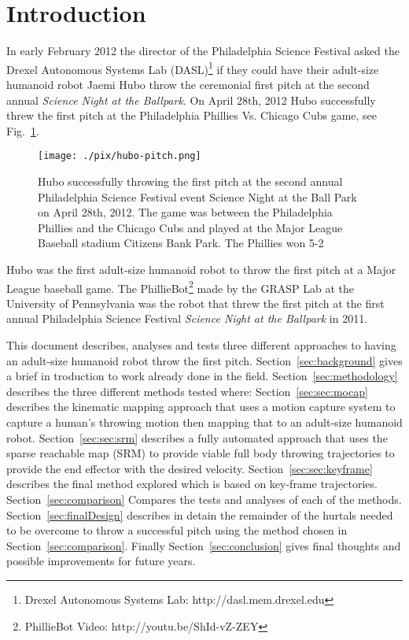 \section{Introduction}
In early February 2012 the director of the Philadelphia Science Festival asked the Drexel Autonomous Systems Lab (DASL)\footnote{Drexel Autonomous Systems Lab: http://dasl.mem.drexel.edu}\label{foot:dasl} if they could have their adult-size humanoid robot Jaemi Hubo throw the ceremonial first pitch at the second annual \textit{Science Night at the Ballpark}.  On April 28th, 2012 Hubo successfully threw the first pitch at the Philadelphia Phillies Vs. Chicago Cubs game, see Fig.~\ref{fig:hubo-throw}.  

\begin{figure}[t]
  \centering
\texttt{[image: ./pix/hubo-pitch.png]}
  \caption{Hubo successfully throwing the first pitch at the second annual Philadelphia Science Festival event Science Night at the Ball Park on April 28th, 2012.  The game was between the Philadelphia Phillies and the Chicago Cubs and played at the Major League Baseball stadium Citizens Bank Park.  The Phillies won 5-2}
  \label{fig:hubo-throw}
\end{figure}

Hubo was the first adult-size humanoid robot to throw the first pitch at a Major League baseball game.  The PhillieBot\footnote{PhillieBot Video: http://youtu.be/ShId-vZ-ZEY} made by the GRASP Lab at the University of Pennsylvania was the robot that threw the first pitch at the first annual Philadelphia Science Festival \textit{Science Night at the Ballpark} in 2011.  

This document describes, analyses and tests three different approaches to having an adult-size humanoid robot throw the first pitch.  
Section~\ref{sec:background} gives a brief in troduction to work already done in the field.
Section~\ref{sec:methodology} describes the three different methods tested where:
Section~\ref{sec:sec:mocap} describes the kinematic mapping approach that uses a motion capture system to capture a human's throwing motion then mapping that to an adult-size humanoid robot.  
Section~\ref{sec:sec:srm} describes a fully automated approach that uses the sparse reachable map (SRM) to provide viable full body throwing trajectories to provide the end effector with the desired velocity\cite{dlofaro-srm}.
Section~\ref{sec:sec:keyframe} describes the final method explored which is based on key-frame trajectories.
Section~\ref{sec:comparison} Compares the tests and analyses of each of the methods.
Section~\ref{sec:finalDesign} describes in detain the remainder of the hurtals needed to be overcome to throw a successful pitch using the method chosen in Section~\ref{sec:comparison}.
Finally Section~\ref{sec:conclusion} gives final thoughts and possible improvements for future years.


